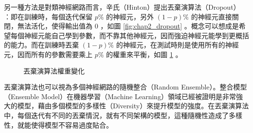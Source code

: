 另一種方法是對類神經網路而言，辛氏（Hinton）提出丟棄演算法（Dropout）~\cite{srivastava2014dropout} ：即在訓練時，每個迭代保留 $p\%$ 的神經元，另外 $(1-p)\%$ 的神經元直接關閉，無法活化，使得輸出值為 0 ，如圖 \ref{fig:chap2_dropout} 。概念可以想成是希望每個神經元能自己學到參數，而不靠其他神經元，因而強迫神經元能學到更概括的能力。而在訓練時丟棄 $(1-p)\%$ 的神經元，在測試時則是使用所有的神經元，因而所有的參數需要乘上 $p\%$ 的權重來平衡，如圖 \ref{fig:chap2_drop_w} 。

\begin{figure}[h]
    \centering
    \caption{丟棄演算法權重變化\cite{srivastava2014dropout}}\label{fig:chap2_drop_w}
\end{figure}

丟棄演算法也可以視為多個神經網路的隨機整合（Random Ensemble）。整合模型（Ensemble Model）在機器學習（Machine Learning）領域已經被證明是非常強大的模型，藉由多個模型的多樣性（Diversity）來提升模型的強度。在丟棄演算法中，每個迭代有不同的丟棄情況，就有不同架構的模型，這種隨機性造成了多樣性，就能使得模型不容易過度貼合。

